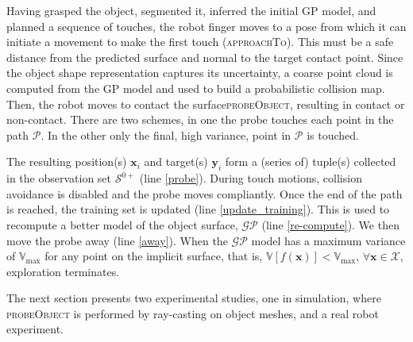 Having grasped the object, segmented it, inferred the initial GP model, and planned a sequence of touches, the robot finger moves to a pose from which it can initiate a movement to make the first touch (\textsc{approachTo}). This must be a safe distance from the predicted surface and normal to the target contact point. Since the object shape representation captures its uncertainty, a coarse point cloud is computed from the GP model and used to build a probabilistic collision map. Then, the robot moves to contact the surface\textsc{probeObject}, resulting in contact or non-contact. There are two schemes, in one the probe touches each point in the path $\mathcal{P}$. In the other only the final, high variance, point in $\mathcal{P}$ is touched.

The resulting position(s) $\mathbf{x}_i$ and target(s) $\mathbf{y}_i$ form a (series of) tuple(s) collected in the observation set $\mathcal{S}^{0+}$ (line \ref{probe}). During touch motions, collision avoidance is disabled and the probe moves compliantly. Once the end of the path is reached, the training set is updated (line \ref{update_training}). This is used to recompute a better model of the object surface, $\mathcal{GP}$ (line \ref{re-compute}). We then move the probe away (line \ref{away}). When the $\mathcal{GP}$ model has a maximum variance of $\mathbb{V}_{\max}$ for any point on the implicit surface, that is, $\mathbb{V}[f(\mathbf{x})] < \mathbb{V}_{\max}, \, \forall \mathbf{x} \in \mathcal{X}$, exploration terminates.

The next section presents two experimental studies, one in simulation, where \textsc{probeObject} is performed by ray-casting on object meshes, and a real robot experiment.


